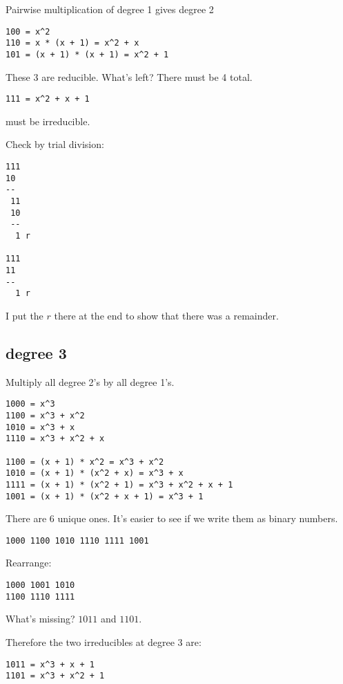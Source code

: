\documentclass[11pt, oneside]{article}
\begin{document}
Pairwise multiplication of degree 1 gives degree 2

\begin{verbatim}
100 = x^2
110 = x * (x + 1) = x^2 + x
101 = (x + 1) * (x + 1) = x^2 + 1
\end{verbatim}

These 3 are reducible.  What's left?  There must be 4 total.

\begin{verbatim}
111 = x^2 + x + 1
\end{verbatim}
must be irreducible.

Check by trial division:

\begin{verbatim}
111
10
--
 11
 10
 -- 
  1 r
  
111
11
--
  1 r
\end{verbatim}

I put the $r$ there at the end to show that there was a remainder.

\subsection*{degree 3}

Multiply all degree 2's by all degree 1's.

\begin{verbatim}
1000 = x^3
1100 = x^3 + x^2
1010 = x^3 + x
1110 = x^3 + x^2 + x

1100 = (x + 1) * x^2 = x^3 + x^2
1010 = (x + 1) * (x^2 + x) = x^3 + x
1111 = (x + 1) * (x^2 + 1) = x^3 + x^2 + x + 1
1001 = (x + 1) * (x^2 + x + 1) = x^3 + 1
\end{verbatim}

There are 6 unique ones.  It's easier to see if we write them as binary numbers.

\begin{verbatim}
1000 1100 1010 1110 1111 1001
\end{verbatim}

Rearrange:

\begin{verbatim}
1000 1001 1010
1100 1110 1111
\end{verbatim}

What's missing?  $1011$ and $1101$.

Therefore the two irreducibles at degree 3 are:

\begin{verbatim}
1011 = x^3 + x + 1
1101 = x^3 + x^2 + 1
\end{verbatim}
\end{document}
